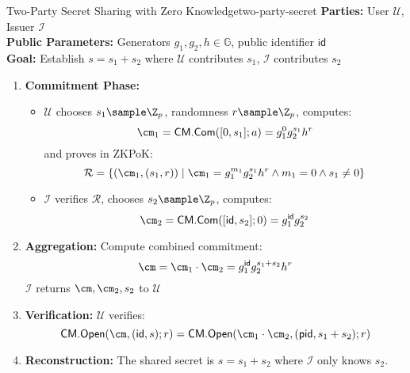 \begin{protocol}{Two-Party Secret Sharing with Zero Knowledge}{two-party-secret}
\textbf{Parties:} User $\mathcal{U}$, Issuer $\mathcal{I}$\\
\textbf{Public Parameters:} Generators $g_1, g_2, h \in \mathbb{G}$, public identifier $\textsf{id}$\\
\textbf{Goal:} Establish $s = s_1 + s_2$ where $\mathcal{U}$ contributes $s_1$, $\mathcal{I}$ contributes $s_2$

\begin{enumerate}
    \item \textbf{Commitment Phase:}
    \begin{itemize}
        \item $\mathcal{U}$ chooses $s_1 \sample \Z_p$, randomness $r \sample \Z_p$, computes:
        \[
        \cm_1 = \textsf{CM.Com}([0, s_1]; a) = g_1^0 g_2^{s_1} h^r
        \]
        and proves in ZKPoK: 
        \[
        \mathcal{R} = \left\{ (\cm_1, (s_1, r)) \mid \cm_1 = g_1^{m_1}g_2^{s_1} h^r \land m_1 = 0 \land s_1 \neq 0 \right\}
        \]
        
        \item $\mathcal{I}$ verifies $\mathcal{R}$, chooses $s_2 \sample \Z_p$, computes:
        \[
        \cm_2 = \textsf{CM.Com}([\textsf{id}, s_2]; 0) = g_1^{\textsf{id}} g_2^{s_2}
        \]
    \end{itemize}
    
    \item \textbf{Aggregation:} Compute combined commitment:
    \[
    \cm = \cm_1 \cdot \cm_2 = g_1^{\textsf{id}} g_2^{s_1 + s_2} h^r
    \]
    $\mathcal{I}$ returns $\cm, \cm_2, s_2$ to $\mathcal{U}$
    \item \textbf{Verification:} $\mathcal{U}$ verifies:
    \[
    \textsf{CM.Open}(\cm, (\textsf{id}, s); r) = \textsf{CM.Open}(\cm_1 \cdot \cm_2, (\textsf{pid}, s_1 + s_2); r)
    \]
    
    \item \textbf{Reconstruction:} The shared secret is $s = s_1 + s_2$ where $\mathcal{I}$ only knows $s_2$.
    
\end{enumerate}
\end{protocol}



